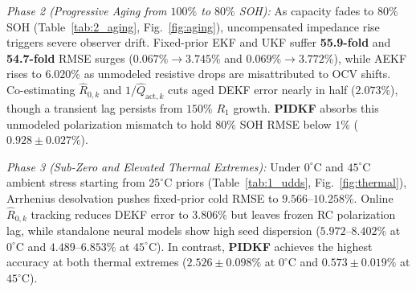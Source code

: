 \documentclass[10pt,a4paper]{article}
\begin{document}
\emph{Phase 2 (Progressive Aging from $100\%$ to $80\%$ SOH):} As capacity fades to $80\%$ SOH (Table~\ref{tab:2_aging}, Fig.~\ref{fig:aging}), uncompensated impedance rise triggers severe observer drift. Fixed-prior EKF and UKF suffer \textbf{55.9-fold} and \textbf{54.7-fold} RMSE surges ($0.067\% \rightarrow 3.745\%$ and $0.069\% \rightarrow 3.772\%$), while AEKF rises to $6.020\%$ as unmodeled resistive drops are misattributed to OCV shifts. Co-estimating $\hat{R}_{0,k}$ and $1/\hat{Q}_{\text{act},k}$ cuts aged DEKF error nearly in half ($2.073\%$), though a transient lag persists from $150\%$ $R_1$ growth. \textbf{PIDKF} absorbs this unmodeled polarization mismatch to hold $80\%$ SOH RMSE below $1\%$ ($0.928\pm0.027\%$).

\emph{Phase 3 (Sub-Zero and Elevated Thermal Extremes):} Under $0^\circ\text{C}$ and $45^\circ\text{C}$ ambient stress starting from $25^\circ\text{C}$ priors (Table~\ref{tab:1_udds}, Fig.~\ref{fig:thermal}), Arrhenius desolvation pushes fixed-prior cold RMSE to $9.566\text{--}10.258\%$. Online $\hat{R}_{0,k}$ tracking reduces DEKF error to $3.806\%$ but leaves frozen RC polarization lag, while standalone neural models show high seed dispersion ($5.972\text{--}8.402\%$ at $0^\circ\text{C}$ and $4.489\text{--}6.853\%$ at $45^\circ\text{C}$). In contrast, \textbf{PIDKF} achieves the highest accuracy at both thermal extremes ($2.526\pm0.098\%$ at $0^\circ\text{C}$ and $0.573\pm0.019\%$ at $45^\circ\text{C}$).
\end{document}
